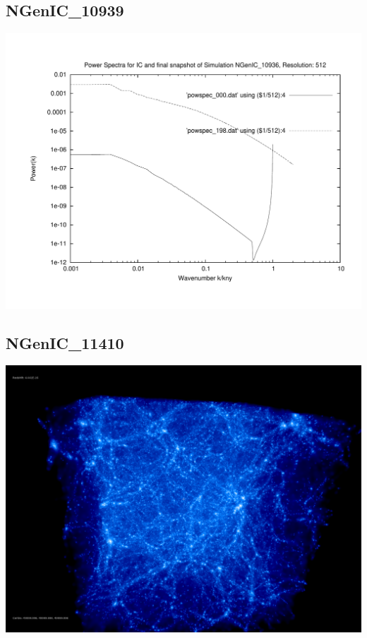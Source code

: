 \subsection{NGenIC\_10939} 
\includegraphics[scale=0.5]{r512/NGenIC_10936/plot_powspec_NGenIC_10936.pdf}

% 
%
%
%
%
%
%
%

\newpage
\subsection{NGenIC\_11410}
\includegraphics[scale=0.2]{r512/NGenIC_11410/screenshot_snapshot_200.png} \\

